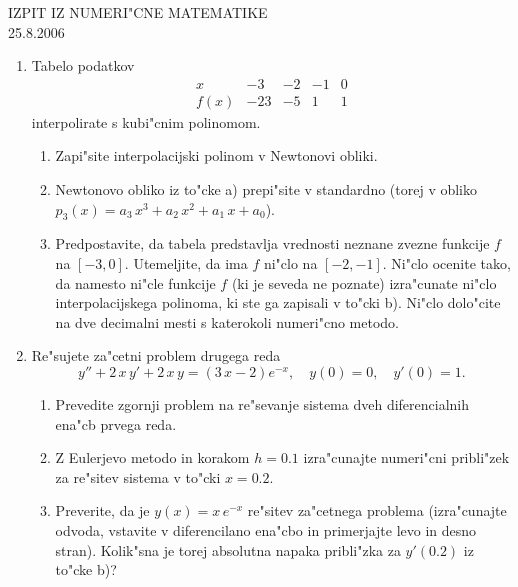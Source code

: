 

\begin{center}
  {\large IZPIT IZ NUMERI"CNE MATEMATIKE\\
    25.8.2006}
\end{center}
\vspace{1.5cm}
\begin{enumerate}
\item Tabelo podatkov
  $$
    \begin{array}{r|llll}
    	x & -3 & -2 & -1 & 0 \\ \hline
    	f(x)& -23 & -5 &  1 &    1
    \end{array}
  $$
  interpolirate s kubi"cnim polinomom.
      \begin{enumerate}
        \item Zapi"site interpolacijski polinom v Newtonovi obliki. 
        \item Newtonovo obliko iz to"cke a) prepi"site
          v standardno (torej v obliko $p_3(x)=a_3\,x^3+
          a_2\,x^2+a_1\,x+a_0$).
        \item Predpostavite, da tabela predstavlja vrednosti
          neznane zvezne funkcije $f$ na $[-3,0]$.
          Utemeljite, da ima $f$ ni"clo na $[-2,-1]$. 
          Ni"clo ocenite tako, da namesto ni"cle funkcije $f$ (ki je
          seveda ne poznate) izra"cunate ni"clo interpolacijskega
          polinoma, ki ste ga zapisali v to"cki b). 
          Ni"clo dolo"cite na dve decimalni mesti s katerokoli
          numeri"cno metodo.
      \end{enumerate}
\item Re"sujete za"cetni problem drugega reda
  $$
    y''+2\,x\,y'+2\,x\,y=(3\,x-2)e^{-x},\quad y(0)=0,\quad y'(0)=1.
  $$
  \begin{enumerate}
    \item Prevedite zgornji problem na re"sevanje
      sistema dveh diferencialnih ena"cb prvega reda.
    \item Z Eulerjevo metodo in korakom $h=0.1$ 
      izra"cunajte numeri"cni pribli"zek za re"sitev
      sistema v to"cki $x=0.2$. 
    \item Preverite, da je
      $y(x)=x\,e^{-x}$ re"sitev za"cetnega problema 
      (iz\-ra\-"cu\-naj\-te
      odvoda, vstavite v diferencilano ena"cbo in primerjajte
      levo in desno stran).
      Kolik"sna je torej absolutna napaka pribli"zka za $y'(0.2)$
      iz to"cke b)?
  \end{enumerate}

\end{enumerate}


